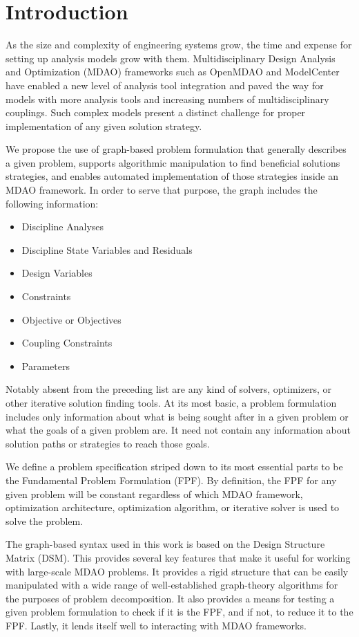 \section{Introduction}
    
    As the size and complexity of engineering systems grow, the time and expense for setting up 
    analysis models grow with them. Multidisciplinary Design Analysis and Optimization (MDAO)
    frameworks such as OpenMDAO\cite{Gray2012} and ModelCenter have enabled a new level of analysis tool integration 
    and paved the way for models with more analysis tools and increasing numbers of multidisciplinary couplings. 
    Such complex models present a distinct challenge for proper implementation of any given solution strategy. 
    
    We propose the use of graph-based problem formulation that generally describes a
    given problem, supports algorithmic manipulation to find beneficial solutions strategies, and enables automated 
    implementation of those strategies inside an MDAO framework. In order to serve that purpose, the graph includes the following information: 
    \begin{itemize}
       \item Discipline Analyses 
       \item Discipline State Variables and Residuals
       \item Design Variables
       \item Constraints
       \item Objective or Objectives
       \item Coupling Constraints
       \item Parameters
    \end{itemize}
    Notably absent from the preceding list are any kind of solvers, optimizers, or other iterative solution finding tools. 
    At its most basic, a problem formulation includes only information about what is being sought after in a given problem or what the
    goals of a given problem are. It need not contain any information about solution paths or strategies to reach those goals. 

    We define a problem specification striped down to its most essential parts to be the 
    Fundamental Problem Formulation (FPF). By definition, the FPF for any given problem will be constant regardless 
    of which MDAO framework, optimization architecture, optimization algorithm, or iterative solver is used to solve the problem.

    The graph-based syntax used in this work is based on the Design Structure Matrix (DSM). 
    This provides several key features that make it useful for working with large-scale MDAO problems. 
    It provides a rigid structure that can be easily manipulated with a wide range of well-established graph-theory algorithms 
    for the purposes of problem decomposition. It also provides a means for testing a given 
    problem formulation to check if it is the FPF, and if not, to reduce it to the FPF. Lastly, it lends itself 
    well to interacting with MDAO frameworks. 

